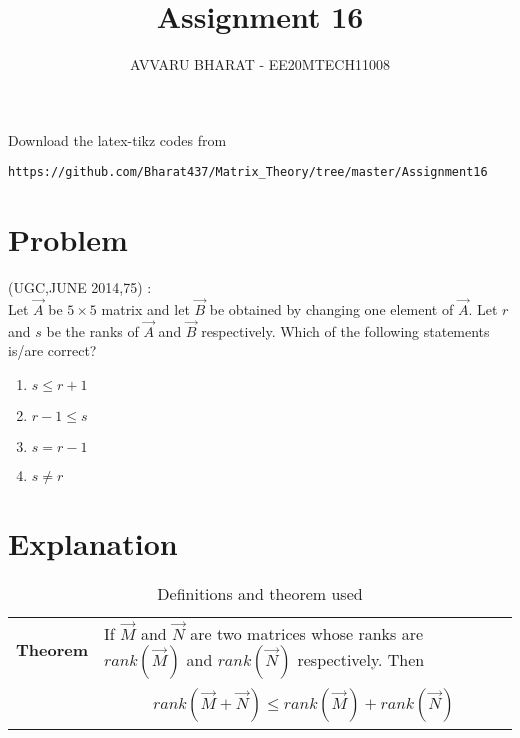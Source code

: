 \documentclass[journal,12pt]{IEEEtran}
\begin{document}
     \def\rightbox#1{\makebox[0in][r]{#1}}
     \def\centbox#1{\makebox[0in]{#1}}
     \def\topbox#1{\raisebox{-\baselineskip}[0in][0in]{#1}}
     \def\midbox#1{\raisebox{-0.5\baselineskip}[0in][0in]{#1}}
\vspace{3cm}
\title{Assignment 16}
\author{AVVARU BHARAT - EE20MTECH11008}
\maketitle
\bigskip
\renewcommand{\thefigure}{\theenumi}
\renewcommand{\thetable}{\theenumi}
%
Download the latex-tikz codes from 
%
\begin{lstlisting}
https://github.com/Bharat437/Matrix_Theory/tree/master/Assignment16
\end{lstlisting}
\section{\textbf{Problem}}
(UGC,JUNE 2014,75) : \\
%
Let $\vec{A}$ be $5\times5$ matrix and let $\vec{B}$ be obtained by changing one element of $\vec{A}$. Let $r$ and $s$ be the ranks of $\vec{A}$ and $\vec{B}$ respectively. Which of the following statements is/are correct?
\begin{enumerate}
    \item $s\leq r+1$
    \item $r-1\leq s$
    \item $s=r-1$
    \item $s\neq r$
\end{enumerate}
\section{\textbf{Explanation}}
\renewcommand{\thetable}{1}
\begin{longtable}{|l|l|}
\hline
\endhead
\textbf{Theorem}&If $\vec{M}$ and $\vec{N}$ are two matrices whose ranks are $rank(\vec{M})$ and $rank(\vec{N})$ respectively. Then\\&\parbox{14cm}{\begin{align}
    rank(\vec{M}+\vec{N})\leq rank(\vec{M})+rank(\vec{N})\label{prop}
\end{align}}\\
\hline
\caption{Definitions and theorem used}
\label{deftab}
\end{longtable}
\end{document}

